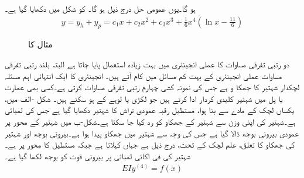 ہو گا۔یوں عمومی حل درج ذیل ہو گا۔ کو شکل  میں دکھایا گیا ہے۔
\begin{align*}
y=y_h+y_p=c_1x+c_2x^2+c_3x^3+\frac{1}{6}x^4\left(\ln x-\frac{11}{6}\right)
\end{align*}
%
\begin{figure}
\centering
{}
\caption{مثال  کا }
\label{شکل_مثال_سادہ_بلند_یولر_کوشی_بدل}
\end{figure}

دو رتبی تفرقی مساوات کا عملی انجینئری میں بہت زیادہ استعمال پایا جاتا ہے البتہ بلند رتبی تفرقی مساوات عملی انجینئری کے بہت کم مسائل میں کام آتے ہیں۔ انجینئری کا ایک انتہائی اہم مسئلہ لچکدار شہتیر کا جھکا و ہے جس کی نمونہ کشی  چہارم رتبی تفرقی مساوات کرتی ہے۔کسی بھی عمارت یا پل میں شہتیر کلیدی کردار ادا کرتے ہیں جو لکڑی یا لوہے کے ہو سکتے ہیں۔
شکل -الف میں، یکساں لچک کے مادے سے بنا ہوا، مستطیل رقبہ عمودی تراش کا شہتیر دکھایا گیا ہے جس کی لمبائی  ہے۔شہتیر کی اپنی وزن سے شہتیر کے جھکاو کو رد کیا جا سکتا ہے۔شکل-ب میں شہتیر کے  محور پر عمودی بیرونی بوجھ  ڈالا گیا ہے جس کی وجہ سے شہتیر میں جھکاو پیدا ہوا ہے۔بیرونی بوجھ اور شہتیر کی جھکاو کا تعلق، علم لچک کے تحت، درج ذیل ہے  جہاں   کہلاتا ہے جبکہ  مستطیل کا  محور پر  ہے۔شہتیر کی فی اکائی لمبائی پر بیرونی قوت کو بوجھ  لکھا گیا ہے۔ 
\begin{align}\label{مساوات_سادہ_بلند_شہتیر_کا_جھکاو_الف}
EIy^{(4)}=f(x)
\end{align}


